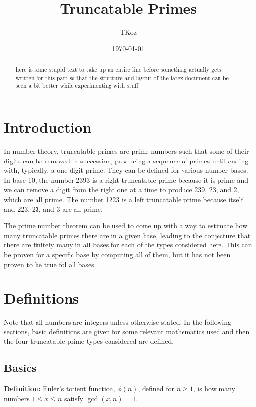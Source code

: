 \documentclass[12pt]{article}
\begin{document}
\title{Truncatable Primes}
\author{TKoz}
\date{\today}
\maketitle

\begin{abstract}
here is some stupid text to take up an entire line before something actually gets written for this part so that the structure and layout of the latex document can be seen a bit better while experimenting with stuff
\end{abstract}

\section{Introduction}

In number theory, truncatable primes are prime numbers such that some of their digits can be removed in succession, producing a sequence of primes until ending with, typically, a one digit prime. They can be defined for various number bases. In base 10, the number 2393 is a right truncatable prime because it is prime and we can remove a digit from the right one at a time to produce 239, 23, and 2, which are all prime. The number 1223 is a left truncatable prime because itself and 223, 23, and 3 are all prime.

The prime number theorem can be used to come up with a way to estimate how many truncatable primes there are in a given base, leading to the conjecture that there are finitely many in all bases for each of the types considered here. This can be proven for a specific base by computing all of them, but it has not been proven to be true fol all bases.

\section{Definitions}

Note that all numbers are integers unless otherwise stated. In the following sections, basic definitions are given for some relevant mathematics used and then the four truncatable prime types considered are defined.

\subsection{Basics}

\textbf{Definition:} Euler's totient function, $\phi(n)$, defined for $n\geq1$, is how many numbers $1\leq x\leq n$ satisfy $\gcd(x,n)=1$.
\end{document}
